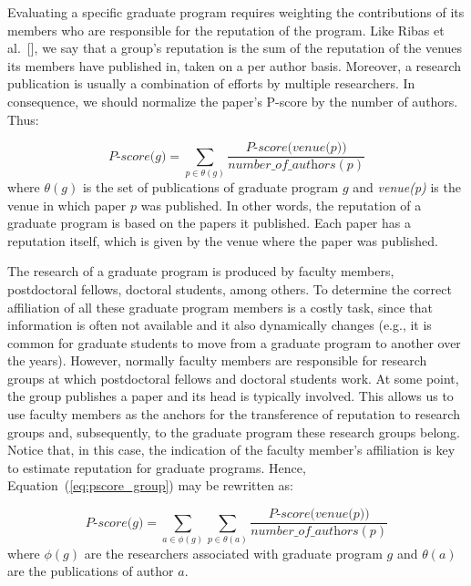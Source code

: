 \documentclass[msc]{ppgccufmg}
\begin{document}
Evaluating a specific graduate program requires weighting the contributions of its members who are responsible for the reputation of the program. Like Ribas et al.~[\citeyear{ribas2015random}], we say that a group's reputation is the sum of the reputation of the venues its members have published in, taken on a per author basis. Moreover, a research publication is usually a combination of efforts by multiple researchers. In consequence, we should normalize the paper's P-score by the number of authors. 
Thus:

\begin{equation}\label{eq:pscore_group}
    \textit{P-score($g$)} = \sum_{p \in \theta(g)} \frac{\textit{P-score(venue(p))}}{\textit{number\_of\_authors}(p)}
\end{equation}
where $\theta(g)$ is the set of publications of graduate program $g$ and \textit{venue(p)} is the venue in which paper $p$ was published.
%
In other words, the reputation of a graduate program is based on the papers it published. Each paper has a reputation itself, which is given by the venue where the paper was published. 

{\color{blue}
The research of a graduate program is produced by faculty members, postdoctoral fellows, doctoral students, among others. To determine the correct affiliation of all these graduate program members is a costly task, since that information is often not available and it also dynamically changes (e.g., it is common for graduate students to move from a graduate program to another over the years). However, normally faculty members are responsible for research groups at which postdoctoral fellows and doctoral students work. At some point, the group publishes a paper and its head is typically involved. This allows us to use faculty members as the anchors for the transference of reputation to research groups and, subsequently, to the graduate program these research groups belong. Notice that, in this case, the indication of the faculty member's affiliation is key to estimate reputation for graduate programs. Hence, Equation~(\ref{eq:pscore_group}) may be rewritten as:
}

\begin{equation}\label{eq:pscore_group_author}
    \textit{P-score($g$)} = \sum_{a \in \phi(g)} \sum_{p \in \theta(a)}  \frac{\textit{P-score(venue(p))}}{\textit{number\_of\_authors}(p)}
\end{equation}
where $\phi(g)$ are the researchers associated with graduate program $g$ and $\theta(a)$ are the publications of author $a$. 
\end{document}
